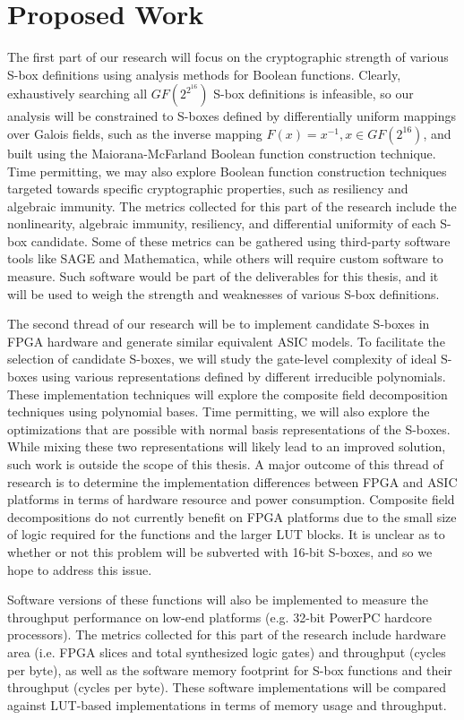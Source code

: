 \section{Proposed Work}
The first part of our research will focus on the cryptographic strength of 
various S-box definitions using analysis methods for Boolean functions. Clearly, exhaustively searching
all $GF(2^{2^{16}})$ S-box definitions is infeasible, so our analysis will be constrained
to S-boxes defined by differentially uniform mappings over Galois fields, such as the
inverse mapping $F(x) = x^{-1}, x \in GF(2^{16})$, and built 
using the Maiorana-McFarland Boolean function construction technique. Time
permitting, we may also explore Boolean function construction techniques targeted towards specific
cryptographic properties, such as resiliency and algebraic immunity. 
The metrics collected for this part of the research include the nonlinearity,
algebraic immunity, resiliency, and differential uniformity of each S-box candidate. 
Some of these metrics can be gathered using third-party software tools like 
SAGE and Mathematica, while others will require custom software to measure. Such
software would be part of the deliverables for this thesis, and it will be used
to weigh the strength and weaknesses of various S-box definitions. 
 
The second thread of our research will be to implement candidate S-boxes in FPGA hardware and generate 
similar equivalent ASIC models. To facilitate the selection of candidate S-boxes, 
we will study the gate-level complexity of ideal S-boxes using various
representations defined by different irreducible polynomials. These implementation techniques will explore the composite field
decomposition techniques using polynomial bases. Time permitting, we will also explore the optimizations
that are possible with normal basis representations of the S-boxes. While mixing these two representations
will likely lead to an improved solution, such work is outside the scope of this thesis. A major outcome
of this thread of research is to determine the implementation differences between FPGA and ASIC platforms
in terms of hardware resource and power consumption. Composite field decompositions do not currently benefit
on FPGA platforms due to the small size of logic required for the functions and the larger LUT blocks. 
It is unclear as to whether or not this problem will be subverted with 16-bit S-boxes, and so we hope 
to address this issue. 

Software versions of these functions will also be implemented to measure the throughput performance
on low-end platforms (e.g. 32-bit PowerPC hardcore processors).
The metrics collected for this part of the research include hardware area (i.e.
FPGA slices and total synthesized logic gates) and throughput (cycles per byte), as well
as the software memory footprint for S-box functions and their throughput (cycles per byte).
These software implementations will be compared against LUT-based implementations in terms of 
memory usage and throughput. 